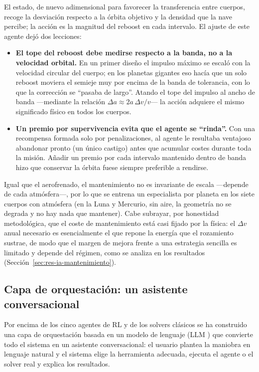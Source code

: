 El estado, de nuevo adimensional para favorecer la transferencia entre cuerpos, recoge la desviación respecto a la órbita objetivo y la densidad que la nave percibe; la acción es la magnitud del reboost en cada intervalo. El ajuste de este agente dejó dos lecciones:
\begin{itemize}
  \item \textbf{El tope del reboost debe medirse respecto a la banda, no a la velocidad orbital.} En un primer diseño el impulso máximo se escaló con la velocidad circular del cuerpo; en los planetas gigantes eso hacía que un solo reboost moviera el semieje muy por encima de la banda de tolerancia, con lo que la corrección se ``pasaba de largo''. Atando el tope del impulso al ancho de banda ---mediante la relación $\Delta a \approx 2a\,\Delta v/v$--- la acción adquiere el mismo significado físico en todos los cuerpos.
  \item \textbf{Un premio por supervivencia evita que el agente se ``rinda''.} Con una recompensa formada solo por penalizaciones, al agente le resultaba ventajoso abandonar pronto (un único castigo) antes que acumular costes durante toda la misión. Añadir un premio por cada intervalo mantenido dentro de banda hizo que conservar la órbita fuese siempre preferible a rendirse.
\end{itemize}

Igual que el aerofrenado, el mantenimiento no es invariante de escala ---depende de cada atmósfera---, por lo que se entrena un especialista por planeta en los siete cuerpos con atmósfera (en la Luna y Mercurio, sin aire, la geometría no se degrada y no hay nada que mantener). Cabe subrayar, por honestidad metodológica, que el coste de mantenimiento está casi fijado por la física: el $\Delta v$ anual necesario es esencialmente el que repone la energía que el rozamiento sustrae, de modo que el margen de mejora frente a una estrategia sencilla es limitado y depende del régimen, como se analiza en los resultados (Sección~\ref{sec:res-ia-mantenimiento}).

\subsection{Capa de orquestación: un asistente conversacional}
\label{sec:ia-llm}

Por encima de los cinco agentes de \gls{RL} y de los solvers clásicos se ha construido una capa de orquestación basada en un modelo de lenguaje (\gls{LLM} ) que convierte todo el sistema en un asistente conversacional: el usuario plantea la maniobra en lenguaje natural y el sistema elige la herramienta adecuada, ejecuta el agente o el solver real y explica los resultados.

